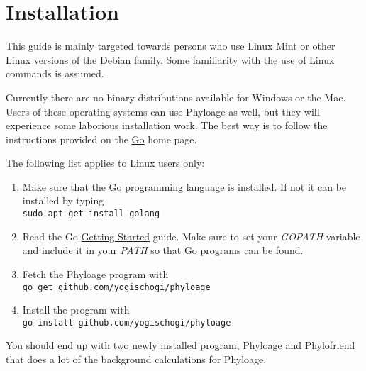 \section{Installation}

This guide is mainly targeted towards persons who use Linux Mint
or other Linux versions of the Debian family. Some familiarity
with the use of Linux commands is assumed.

Currently there are no binary distributions available for
Windows or the Mac. Users of these operating systems can
use Phyloage as well, but they will experience some
laborious installation work. The best way is to follow the
instructions provided on the
\href{http://golang.org/}{Go} home page.

The following list applies to Linux users only:

\begin{enumerate}
\item Make sure that the Go programming language is installed.
	If not it can be installed by typing\\
	\texttt{sudo apt-get install golang}
\item Read the Go
	\href{http://golang.org/doc/install}{Getting Started}
	guide. Make sure to set your \emph{GOPATH} variable and
	include it in your \emph{PATH} so that Go programs can be
	found.
\item Fetch the Phyloage program with\\
	\texttt{go get github.com/yogischogi/phyloage}
\item Install the program with\\
	 \texttt{go install github.com/yogischogi/phyloage}
\end{enumerate}

You should end up with two newly installed program, Phyloage
and Phylofriend \cite{Phylofriend} that does a lot of the background calculations
for Phyloage.

